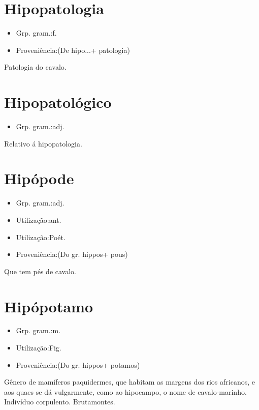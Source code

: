 \documentclass{article}
\begin{document}
\section{Hipopatologia}
\begin{itemize}
\item {Grp. gram.:f.}
\end{itemize}
\begin{itemize}
\item {Proveniência:(De \textunderscore hipo...\textunderscore  + \textunderscore patologia\textunderscore )}
\end{itemize}
Patologia do cavalo.
\section{Hipopatológico}
\begin{itemize}
\item {Grp. gram.:adj.}
\end{itemize}
Relativo á hipopatologia.
\section{Hipópode}
\begin{itemize}
\item {Grp. gram.:adj.}
\end{itemize}
\begin{itemize}
\item {Utilização:ant.}
\end{itemize}
\begin{itemize}
\item {Utilização:Poét.}
\end{itemize}
\begin{itemize}
\item {Proveniência:(Do gr. \textunderscore hippos\textunderscore  + \textunderscore pous\textunderscore )}
\end{itemize}
Que tem pés de cavalo.
\section{Hipópotamo}
\begin{itemize}
\item {Grp. gram.:m.}
\end{itemize}
\begin{itemize}
\item {Utilização:Fig.}
\end{itemize}
\begin{itemize}
\item {Proveniência:(Do gr. \textunderscore hippos\textunderscore  + \textunderscore potamos\textunderscore )}
\end{itemize}
Gênero de mamíferos paquidermes, que habitam as margens dos rios africanos, e aos quaes se dá vulgarmente, como ao hipocampo, o nome de \textunderscore cavalo-marinho\textunderscore .
Indivíduo corpulento.
Brutamontes.
\end{document}
